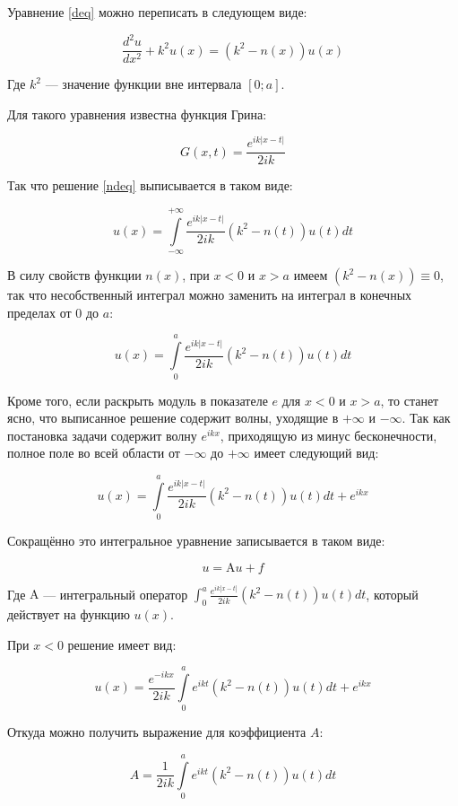 \documentclass{article}
\providecommand{\abs}[1]{\left \lvert{#1}\right \rvert}
\providecommand{\op}[1]{\mathrm{#1}}
\numberwithin{equation}{section}
\begin{document}
Уравнение \eqref{deq} можно переписать в следующем виде:

\begin{equation}\label{ndeq}
\frac{d^2u}{dx^2} + k^2 u(x) = (k^2 - n(x)) u(x)
\end{equation}

Где $k^2$ — значение функции вне интервала $[0; a]$.

Для такого уравнения известна функция Грина:

\[
G(x, t) = \frac{e^{ik\abs{x-t}}}{2ik}
\]

Так что решение \eqref{ndeq} выписывается в таком виде:

\[
u(x) = \int \limits_{-\infty}^{+\infty} {\frac{e^{ik\abs{x-t}}}{2ik} (k^2-n(t))
  u(t) dt}
\]

В силу свойств функции $n(x)$, при $x < 0$ и $x > a$ имеем $(k^2 -
n(x)) \equiv 0$, так что несобственный интеграл можно заменить на
интеграл в конечных пределах от $0$ до $a$:

\[
u(x) = \int \limits_{0}^{a} {\frac{e^{ik\abs{x-t}}}{2ik} (k^2-n(t))
  u(t) dt}
\]

Кроме того, если раскрыть модуль в показателе $e$ для $x<0$ и $x>a$,
то станет ясно, что выписанное решение содержит волны, уходящие в
$+\infty$ и $-\infty$. Так как постановка задачи содержит волну
$e^{ikx}$, приходящую из минус бесконечности, полное поле во всей
области от $-\infty$ до $+\infty$ имеет следующий вид:

\begin{equation}\label{inteq}
u(x) =  \int \limits_{0}^{a} {\frac{e^{ik\abs{x-t}}}{2ik} (k^2-n(t))
  u(t) dt} + e^{ikx}
\end{equation}

Сокращённо это интегральное уравнение записывается в таком виде:

\begin{equation}\label{inteq-short}
u = \op{A}u + f
\end{equation}

Где $\op{A}$ — интегральный оператор $\int_{0}^{a}
{\frac{e^{ik\abs{x-t}}}{2ik} (k^2-n(t)) u(t) dt}$, который действует на
функцию $u(x)$.

При $x < 0$ решение имеет вид:

\[
u(x) = \frac{e^{-ikx}}{2ik} \int \limits_{0}^{a} {e^{ikt} (k^2-n(t))
  u(t) dt} + e^{ikx}
\]

Откуда можно получить выражение для коэффициента $A$:

\begin{equation}\label{int-A}
  A = \frac{1}{2ik} \int \limits_{0}^{a} {e^{ikt} (k^2-n(t)) u(t) dt}
\end{equation}
\end{document}
